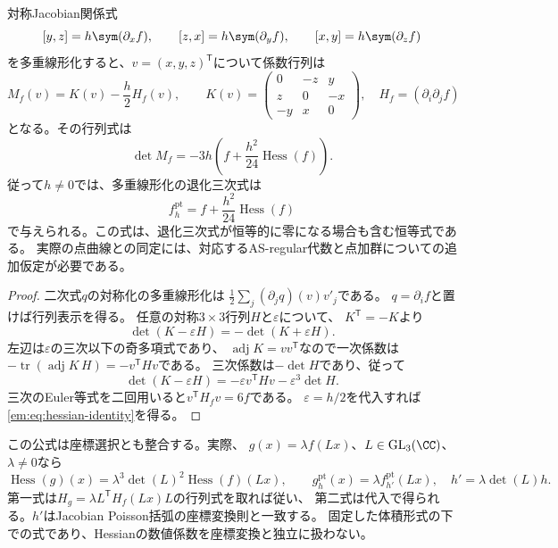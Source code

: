\begin{proposition}
\label{em:prop:hessian-formula}
対称Jacobian関係式
\[
 [y,z]=h\sym(\partial_xf),\qquad
 [z,x]=h\sym(\partial_yf),\qquad
 [x,y]=h\sym(\partial_zf)
\]
を多重線形化すると、$v=(x,y,z)^{\mathsf T}$について係数行列は
\[
 M_f(v)=K(v)-\frac h2 H_f(v),\qquad
 K(v)=\begin{pmatrix}0&-z&y\\z&0&-x\\-y&x&0\end{pmatrix},
 \quad H_f=(\partial_i\partial_j f)
\]
となる。その行列式は
\begin{equation}\label{em:eq:hessian-identity}
 \det M_f=-3h\left(f+\frac{h^2}{24}\operatorname{Hess}(f)\right).
\end{equation}
従って$h\ne0$では、多重線形化の退化三次式は
\begin{equation}\label{em:eq:hessian-candidate}
 f_h^{\mathrm{pt}}=f+\frac{h^2}{24}\operatorname{Hess}(f)
\end{equation}
で与えられる。この式は、退化三次式が恒等的に零になる場合も含む恒等式である。
実際の点曲線との同定には、対応するAS-regular代数と点加群についての追加仮定が必要である。
\end{proposition}
\begin{proof}
二次式$q$の対称化の多重線形化は
$\frac12\sum_j(\partial_jq)(v)v'_j$である。
$q=\partial_i f$と置けば行列表示を得る。
任意の対称$3\times3$行列$H$と$\varepsilon$について、
$K^{\mathsf T}=-K$より
\[
 \det(K-\varepsilon H)=-\det(K+\varepsilon H).
\]
左辺は$\varepsilon$の三次以下の奇多項式であり、
$\operatorname{adj}K=vv^{\mathsf T}$なので一次係数は
$-\operatorname{tr}(\operatorname{adj}K\,H)=-v^{\mathsf T}Hv$である。
三次係数は$-\det H$であり、従って
\[
 \det(K-\varepsilon H)=-\varepsilon v^{\mathsf T}Hv-
 \varepsilon^3\det H.
\]
三次のEuler等式を二回用いると$v^{\mathsf T}H_fv=6f$である。
$\varepsilon=h/2$を代入すれば\eqref{em:eq:hessian-identity}を得る。
\end{proof}

この公式は座標選択とも整合する。実際、
$g(x)=\lambda f(Lx)$、$L\in\mathrm{GL}_3(\CC)$、$\lambda\ne0$なら
\begin{equation}\label{em:eq:hessian-covariance}
 \operatorname{Hess}(g)(x)
 =\lambda^3\det(L)^2\operatorname{Hess}(f)(Lx),\qquad
 g_h^{\mathrm{pt}}(x)=\lambda f_{h'}^{\mathrm{pt}}(Lx),
 \quad h'=\lambda\det(L)h.
\end{equation}
第一式は$H_g=\lambda L^{\mathsf T}H_f(Lx)L$の行列式を取れば従い、
第二式は代入で得られる。$h'$はJacobian Poisson括弧の座標変換則と一致する。
固定した体積形式の下での式であり、Hessianの数値係数を座標変換と独立に扱わない。

